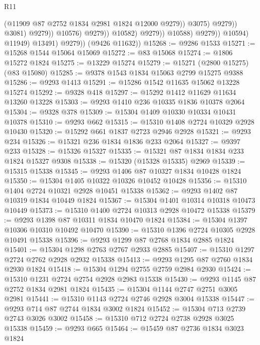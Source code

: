 \begin{lexlean}{R11}
\begin{coremodule}
                                                (@11909 @87 @2752 @1834 @2981 @1824 @12000 @9279))
                                              @3075)
                                            @9279))
                                        @3081)
                                      @9279))
                                  @10576)
                                @9279))
                            @10582)
                          @9279))
                      @10588)
                    @9279))
                @10594)
              @11949)
            @13491)
          @9279))
      (@9426 @11632))
@15268 := @9286 @1533
@15271 := @15268 @1544 @15064 @15069
@15272 := @83 @15068
@15274 := @1806 @15272 @1824
@15275 := @13229 @15274
@15279 := @15271 (@2800 @15275) (@83 @15080)
@15285 := @9378 @1543 @1834 @15063 @2799 @15275 @9388
@15286 := @9293 @1413
@15291 := @15286 @1542 @11635 @15062 @13228 @15274
@15292 := @9328 @418
@15297 := @15292 @1412 @11629 @11634 @13260 @13228
@15303 := @9293 @1410 @236 @10335 @1836 @10378 @2064
@15304 := @9328 @378
@15309 := @15304 @1409 @10330 @10334 @10431 @10378
@15310 := @9293 @662
@15315 := @15310 @1408 @2724 @10329 @2928 @10430
@15320 := @15292 @661 @1837 @2723 @2946 @2928
@15321 := @9293 @234
@15326 := @15321 @236 @1834 @1836 @233 @2064
@15327 := @9397 @233
@15328 := @15326 @15327
@15335 := @15321 @87 @1834 @1834 @233 @1824 @15327 @9308
@15338 := @15320 (@15328 @15335) @2969
@15339 := @15315 @15338
@15345 := @9293 @1406 @87 @10327 @1834 @10428 @1824
@15350 := @15304 @1405 @10322 @10326 @10452 @10428
@15356 := @15310 @1404 @2724 @10321 @2928 @10451 @15338
@15362 := @9293 @1402 @87 @10319 @1834 @10449 @1824
@15367 := @15304 @1401 @10314 @10318 @10473 @10449
@15373 := @15310 @1400 @2724 @10313 @2928 @10472 @15338
@15379 := @9293 @1398 @87 @10311 @1834 @10470 @1824
@15384 := @15304 @1397 @10306 @10310 @10492 @10470
@15390 := @15310 @1396 @2724 @10305 @2928 @10491 @15338
@15396 := @9293 @1299 @87 @2768 @1834 @2885 @1824
@15401 := @15304 @1298 @2763 @2767 @2933 @2885
@15407 := @15310 @1297 @2724 @2762 @2928 @2932 @15338
@15413 := @9293 @1295 @87 @2760 @1834 @2930 @1824
@15418 := @15304 @1294 @2755 @2759 @2984 @2930
@15424 := @15310 @1231 @2724 @2754 @2928 @2983 @15338
@15430 := @9293 @1145 @87 @2752 @1834 @2981 @1824
@15435 := @15304 @1144 @2747 @2751 @3005 @2981
@15441 := @15310 @1143 @2724 @2746 @2928 @3004 @15338
@15447 := @9293 @714 @87 @2744 @1834 @3002 @1824
@15452 := @15304 @713 @2739 @2743 @3026 @3002
@15458 := @15310 @712 @2724 @2738 @2928 @3025 @15338
@15459 := @9293 @665
@15464 := @15459 @87 @2736 @1834 @3023 @1824

\end{coremodule}
\end{lexlean}
